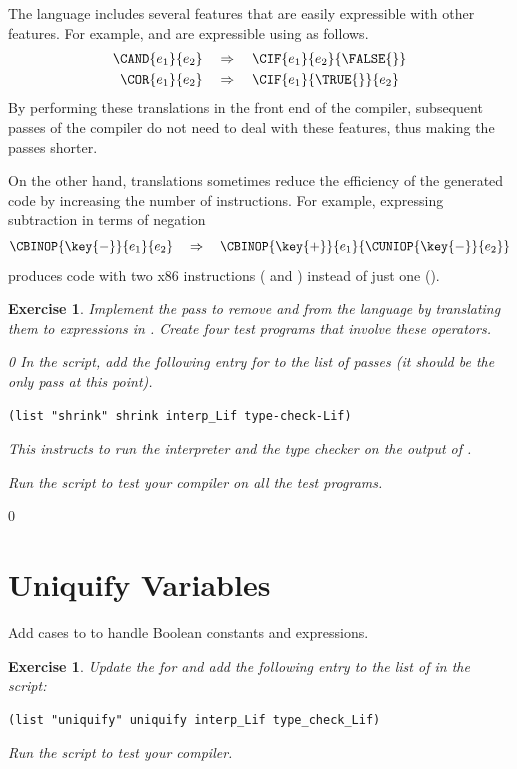 \documentclass[7x10]{TimesAPriori_MIT}%
\def\racketEd{0}
\def\edition{0}
\newtheorem{exercise}[theorem]{Exercise}
\numberwithin{theorem}{chapter}
\numberwithin{definition}{chapter}
\numberwithin{equation}{chapter}
\begin{document}
The \LangIf{} language includes several features that are easily
expressible with other features. For example,  and 
are expressible using  as follows.
\begin{align*}
  \CAND{e_1}{e_2} & \quad \Rightarrow \quad \CIF{e_1}{e_2}{\FALSE{}}\\
  \COR{e_1}{e_2} & \quad \Rightarrow \quad \CIF{e_1}{\TRUE{}}{e_2}
\end{align*}
By performing these translations in the front end of the compiler,
subsequent passes of the compiler do not need to deal with these features,
thus making the passes shorter.

On the other hand, translations sometimes reduce the efficiency of the
generated code by increasing the number of instructions. For example,
expressing subtraction in terms of negation
\[
\CBINOP{\key{-}}{e_1}{e_2} \quad \Rightarrow \quad
  \CBINOP{\key{+}}{e_1}{ \CUNIOP{\key{-}}{e_2} }
\]
produces code with two x86 instructions ( and )
instead of just one ().

\begin{exercise}\normalfont\normalsize
%
Implement the pass  to remove  and  from
the language by translating them to  expressions in \LangIf{}.
%
Create four test programs that involve these operators.
%
{\if\edition\racketEd    
In the  script, add the following entry for
 to the list of passes (it should be the only pass at
this point).
\begin{lstlisting}
(list "shrink" shrink interp_Lif type-check-Lif)
\end{lstlisting}
This instructs  to run the interpreter
 and the type checker  on the
output of .
\fi}
%
Run the script to test your compiler on all the test programs.
\end{exercise}

{\if\edition\racketEd    

\section{Uniquify Variables}
\label{sec:uniquify-Lif}

Add cases to  to handle Boolean constants and
 expressions.

\begin{exercise}\normalfont\normalsize
Update the  for \LangIf{} and add the following
entry to the list of  in the  script:
\begin{lstlisting}
(list "uniquify" uniquify interp_Lif type_check_Lif)
\end{lstlisting}
Run the script to test your compiler.
\end{exercise}

\fi}
\end{document}
